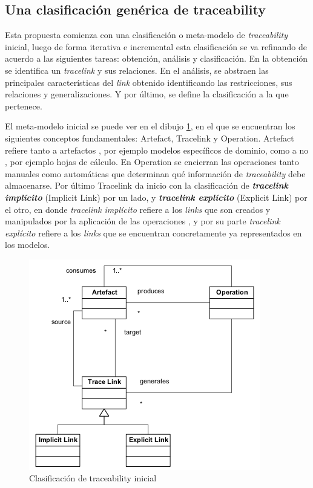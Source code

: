 \documentclass[a4paper,12pt,oneside,spanish]{book}
\begin{document}
\subsection{Una clasificación genérica de traceability}
\label{sec:ClasificacionTraceability}


Esta propuesta comienza con una clasificación o meta-modelo de \textit{traceability} inicial, luego de forma iterativa e incremental esta clasificación se va refinando de acuerdo a las siguientes tareas: obtención, análisis y clasificación. En la obtención se identifica un \textit{tracelink} y sus relaciones. En el análisis, se abstraen las principales características del \textit{link} obtenido identificando las restricciones, sus relaciones y generalizaciones. Y por último, se define la clasificación a la que pertenece.

El meta-modelo inicial se puede ver en el dibujo \ref{fig:ClasifInicial}, en el que se encuentran los siguientes conceptos fundamentales: \textsf{Artefact}, \textsf{Tracelink} y \textsf{Operation}. \textsf{Artefact} refiere tanto a artefactos , por ejemplo modelos específicos de dominio, como a no , por ejemplo hojas de cálculo. En \textsf{Operation} se encierran las operaciones tanto manuales como automáticas que determinan qué información de \textit{traceability} debe almacenarse. Por último \textsf{Tracelink} da inicio con la clasificación de \textit{\textbf{tracelink implícito}} (\textsf{Implicit Link}) por un lado, y \textit{\textbf{tracelink explícito}} (\textsf{Explicit Link}) por el otro, en donde \textit{tracelink implícito} refiere a los \textit{links} que son creados y manipulados por la aplicación de las operaciones , y por su parte \textit{tracelink explícito} refiere a los \textit{links} que se encuentran concretamente ya representados en los modelos.


\begin{figure}[hbtp]
\centering
\includegraphics[scale=1.05]{./img/ExplicitImplicitTraceLinkClassification}
\caption{Clasificación de traceability inicial}
\label{fig:ClasifInicial}
\end{figure}
\end{document}
